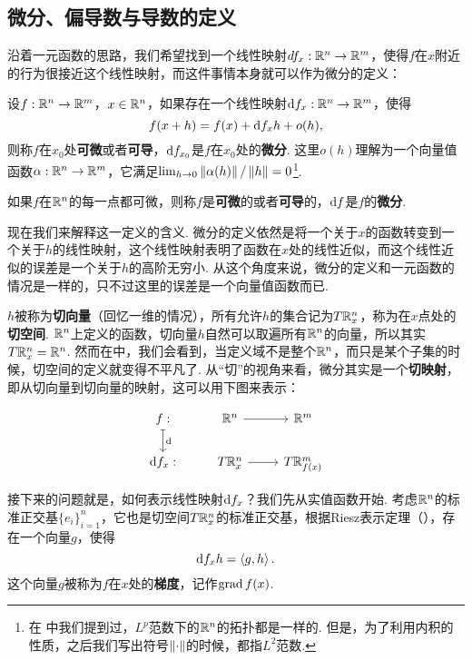 \subsection{微分、偏导数与导数的定义}

沿着一元函数的思路，我们希望找到一个线性映射$df_x:\mathbb{R}^n\to\mathbb{R}^m$，使得$f$在$x$附近的行为很接近这个线性映射，而这件事情本身就可以作为微分的定义：

\begin{definition}[微分]
    设$f:\mathbb{R}^n\to\mathbb{R}^m$，$x\in\mathbb{R}^n$，如果存在一个线性映射$\mathrm{d} f_{x}:\mathbb{R}^n\to\mathbb{R}^m$，使得
    \[
        f(x+h)=f(x)+\mathrm{d} f_{x}h+o(h),
    \]
    则称$f$在$x_0$处\textbf{可微}或者\textbf{可导}，$\mathrm{d} f_{x_0}$是$f$在$x_0$处的\textbf{微分}. 这里$o(h)$理解为一个向量值函数$\alpha:\mathbb{R}^n\to\mathbb{R}^m$，它满足$\lim_{h\to 0}\left\|\alpha(h)\right\|/\left\|h\right\|=0$\footnote{在 中我们提到过，$L^p$范数下的$\mathbb{R}^n$的拓扑都是一样的. 但是，为了利用内积的性质，之后我们写出符号$\left\|\cdot\right\|$的时候，都指$L^2$范数.}.

    如果$f$在$\mathbb{R}^n$的每一点都可微，则称$f$是\textbf{可微}的或者\textbf{可导}的，$\mathrm{d} f$是$f$的\textbf{微分}.
\end{definition}

现在我们来解释这一定义的含义. 微分的定义依然是将一个关于$x$的函数转变到一个关于$h$的线性映射，这个线性映射表明了函数在$x$处的线性近似，而这个线性近似的误差是一个关于$h$的高阶无穷小. 从这个角度来说，微分的定义和一元函数的情况是一样的，只不过这里的误差是一个向量值函数而已. 

$h$被称为\textbf{切向量}（回忆一维的情况），所有允许$h$的集合记为$T\mathbb{R}_x^n$，称为在$x$点处的\textbf{切空间}. $\mathbb{R}^n$上定义的函数，切向量$h$自然可以取遍所有$\mathbb{R}^n$的向量，所以其实$T\mathbb{R}_x^n=\mathbb{R}^n$. 然而在中，我们会看到，当定义域不是整个$\mathbb{R}^n$，而只是某个子集的时候，切空间的定义就变得不平凡了. 从“切”的视角来看，微分其实是一个\textbf{切映射}，即从切向量到切向量的映射，这可以用下图来表示：

\[\begin{tikzcd} f:\arrow[mapsto, d, "\d"] & \R^n\arrow[r, ""] & \R^m \\
\d f_x: & T\R^n_x \arrow[r, ""] & T\R^m_{f(x)}
\end{tikzcd}\]

接下来的问题就是，如何表示线性映射$\mathrm{d} f_x$？我们先从实值函数开始. 考虑$\mathbb{R}^n$的标准正交基$\{e_i\}_{i=1}^n$，它也是切空间$T\mathbb{R}^n_x$的标准正交基，根据Riesz表示定理（），存在一个向量$g$，使得
\[
    \mathrm{d} f_x h=\left\langle{g},{h}\right\rangle.
\]
这个向量$g$被称为$f$在$x$处的\textbf{梯度}，记作$\operatorname*{grad} f(x)$. 

